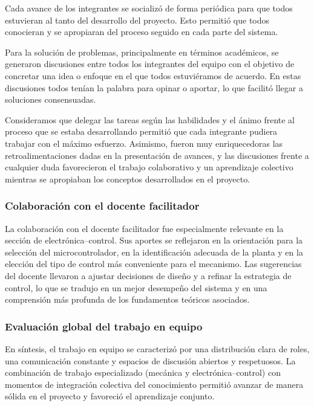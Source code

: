 \documentclass[11pt,a4paper]{article}
\begin{document}
Cada avance de los integrantes se socializó de forma periódica para que todos estuvieran al tanto del
desarrollo del proyecto. Esto permitió que todos conocieran y se apropiaran del proceso seguido en cada
parte del sistema.

Para la solución de problemas, principalmente en términos académicos, se generaron discusiones entre
todos los integrantes del equipo con el objetivo de concretar una idea o enfoque en el que todos
estuviéramos de acuerdo. En estas discusiones todos tenían la palabra para opinar o aportar, lo que
facilitó llegar a soluciones consensuadas.

Consideramos que delegar las tareas según las habilidades y el ánimo frente al proceso que se estaba
desarrollando permitió que cada integrante pudiera trabajar con el máximo esfuerzo. Asimismo, fueron muy
enriquecedoras las retroalimentaciones dadas en la presentación de avances, y las discusiones frente a
cualquier duda favorecieron el trabajo colaborativo y un aprendizaje colectivo mientras se apropiaban los
conceptos desarrollados en el proyecto.

\subsubsection*{Colaboración con el docente facilitador}

La colaboración con el docente facilitador fue especialmente relevante en la sección de
electrónica–control. Sus aportes se reflejaron en la orientación para la selección del microcontrolador,
en la identificación adecuada de la planta y en la elección del tipo de control más conveniente para el
mecanismo. Las sugerencias del docente llevaron a ajustar decisiones de diseño y a refinar la estrategia
de control, lo que se tradujo en un mejor desempeño del sistema y en una comprensión más profunda de los
fundamentos teóricos asociados.

\subsubsection*{Evaluación global del trabajo en equipo}

En síntesis, el trabajo en equipo se caracterizó por una distribución clara de roles, una comunicación
constante y espacios de discusión abiertos y respetuosos. La combinación de trabajo especializado
(mecánica y electrónica–control) con momentos de integración colectiva del conocimiento permitió avanzar
de manera sólida en el proyecto y favoreció el aprendizaje conjunto.
\end{document}
